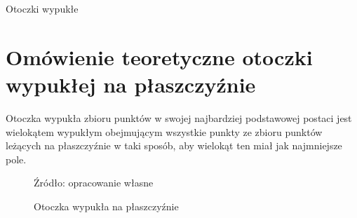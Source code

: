 \newcommand*{\includesDirectory}{includes}
\newcommand*{\settingsDirectory}{\includesDirectory/settings}
\newcommand*{\tikzDirectory}{\includesDirectory/tikz}
\newcommand*{\proovesDirectory}{\includesDirectory/prooves}
\newcommand*{\oneDirectory}{\proovesDirectory/one}
\newcommand*{\listingsDirectory}{\includesDirectory/listings}




















\newcommand{\alignspace}{\vspace{- 3pt}}
\renewcommand{\thelstlisting}{\Roman{chapter}.\arabic{lstlisting}}
\setlength{\abovedisplayskip}{0ex}
\setlength{\belowdisplayskip}{0ex}
\setlength{\abovedisplayshortskip}{0ex}
\setlength{\belowdisplayshortskip}{0ex}
\setlength{\jot}{1.5ex}


    \thispagestyle{empty}
    \begin{center}
        \Huge{Otoczki wypukłe}
    \end{center}
    \tableofcontents	

  

    \chapter{Omówienie teoretyczne otoczki wypukłej na płaszczyźnie}
    Otoczka wypukła zbioru punktów w swojej najbardziej podstawowej postaci jest wielokątem wypukłym obejmującym wszystkie punkty ze zbioru punktów leżących na płaszczyźnie w taki sposób, aby wielokąt ten miał jak najmniejsze pole.    
    \begin{figure}[h!]
        	\begin{center}
    			
    			\caption{Otoczka wypukła na płaszczyźnie}\label{fig:example_hull}
    			
    			Źródło: opracowanie własne
    	\end{center}
    	\vspace{-0.8cm}
    \end{figure}
    
